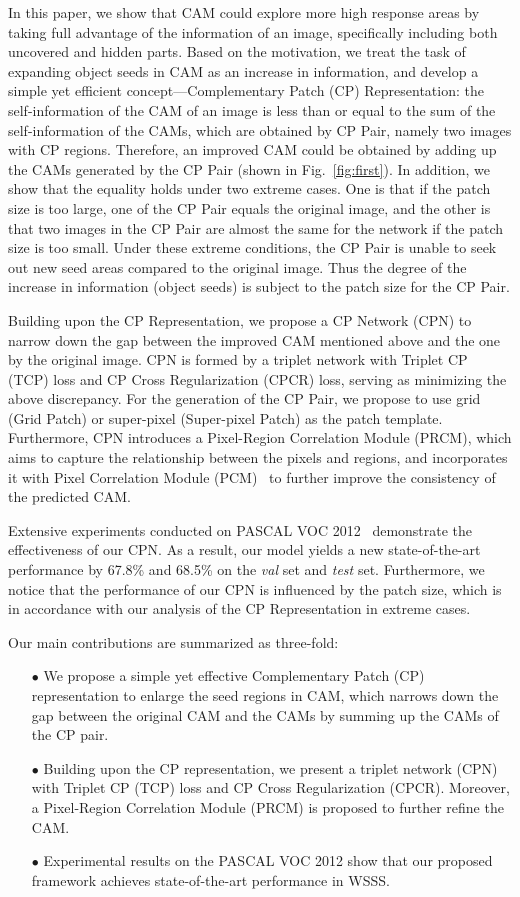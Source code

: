 \documentclass[10pt,twocolumn,letterpaper]{article}
\begin{document}
In this paper, we show that CAM could explore more high response areas by taking full advantage of the information of an image, specifically including both uncovered and hidden parts. Based on the motivation, we treat the task of expanding object seeds in CAM as an increase in information, and develop a simple yet efficient concept---Complementary Patch (CP) Representation: the self-information of the CAM of an image is less than or equal to the sum of the self-information of the CAMs, which are obtained by CP Pair, namely two images with CP regions. Therefore, an improved CAM could be obtained by adding up the CAMs generated by the CP Pair (shown in Fig.~\ref{fig:first}). In addition, we show that the equality holds under two extreme cases. One is that if the patch size is too large, one of the CP Pair equals the original image, and the other is that two images in the CP Pair are almost the same for the network if the patch size is too small. Under these extreme conditions, the CP Pair is unable to seek out new seed areas compared to the original image. Thus the degree of the increase in information (object seeds) is subject to the patch size for the CP Pair.

Building upon the CP Representation, we propose a CP Network (CPN) to narrow down the gap between the improved CAM mentioned above and the one by the original image. CPN is formed by a triplet network with Triplet CP (TCP) loss and CP Cross Regularization (CPCR) loss, serving as minimizing the above discrepancy. For the generation of the CP Pair, we propose to use grid (Grid Patch) or super-pixel (Super-pixel Patch) as the patch template. Furthermore, CPN introduces a Pixel-Region Correlation Module (PRCM), which aims to capture the relationship between the pixels and regions, and incorporates it with Pixel Correlation Module (PCM)~\cite{seam} to further improve the consistency of the predicted CAM.

Extensive experiments conducted on PASCAL VOC 2012~\cite{voc12} demonstrate the effectiveness of our CPN. As a result, our model yields a new state-of-the-art performance by 67.8\% and 68.5\% on the \textit{val} set and \textit{test} set.
Furthermore, we notice that the performance of our CPN is influenced by the patch size, which is in accordance with our analysis of the CP Representation in extreme cases.

Our main contributions are summarized as three-fold:
\begin{itemize}
\item[$\bullet$] We propose a simple yet effective Complementary Patch (CP) representation to enlarge the seed regions in CAM, which narrows down the gap between the original CAM and the CAMs by summing up the CAMs of the CP pair.
\item[$\bullet$] Building upon the CP representation, we present a triplet network (CPN) with Triplet CP (TCP) loss and CP Cross Regularization (CPCR). Moreover, a Pixel-Region Correlation Module (PRCM) is proposed to further refine the CAM.
\item[$\bullet$] Experimental results on the PASCAL VOC 2012 show that our proposed framework achieves state-of-the-art performance in WSSS.
\end{itemize}
\end{document}
